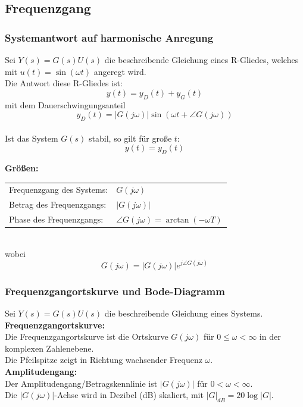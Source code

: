 \documentclass[10pt,a4paper]{article}
\begin{document}
\subsection{Frequenzgang}
\subsubsection{Systemantwort auf harmonische Anregung}
Sei $Y(s) = G(s)U(s)$ die beschreibende Gleichung eines R-Gliedes, welches mit $u(t) = \sin(\omega t)$ angeregt wird. \\
Die Antwort diese R-Gliedes ist:
$$
	y(t) = y_D(t) + y_G(t)
$$
mit dem Dauerschwingungsanteil
$$
	y_D(t) = |G(j\omega)| \sin(\omega t + \angle G(j \omega))
$$ \\

Ist das System $G(s)$ stabil, so gilt für große $t$:
$$
	y(t) = y_D(t)
$$

\textbf{Größen:} \\
\begin{tabular}{ll}
	Frequenzgang des Systems: & $G(j \omega)$ \\
	Betrag des Frequenzgangs: & $|G(j \omega)|$ \\
	Phase des Frequenzgangs: & $\angle G(j \omega) = \arctan(-\omega T)$
\end{tabular} \\

wobei
$$
	G(j \omega) = |G(j \omega)| e^{j \angle G(j \omega)}
$$

\subsubsection{Frequenzgangortskurve und Bode-Diagramm}
Sei $Y(s) = G(s)U(s)$ die beschreibende Gleichung eines Systems. \\

\textbf{Frequenzgangortskurve:} \\
Die Frequenzgangortskurve ist die Ortskurve $G(j \omega)$ für $0 ≤ \omega < ∞$ in der komplexen Zahlenebene. \\
Die Pfeilspitze zeigt in Richtung wachsender Frequenz $\omega$. \\

\textbf{Amplitudengang:} \\
Der Amplitudengang/Betragskennlinie ist $|G(j \omega)|$ für $0 < \omega < ∞$. \\
Die $|G(j \omega)|$-Achse wird in Dezibel (dB) skaliert, mit $|G|_{dB} = 20\log|G|$. \\
\end{document}
